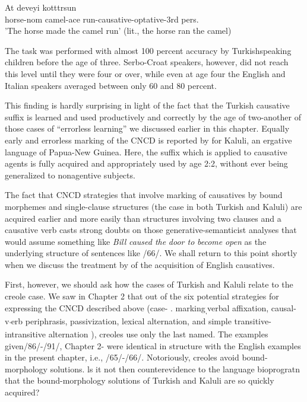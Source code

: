 \ea\label{ex:76}
 At deveyi kotttrsun\\
horse-nom camel-ace run-causative-optative-3rd pers. \\
\glt'The horse made the camel run' (lit., the horse ran the camel)
\z
 

The task was performed with almost 100 percent accuracy by Turkish\-speaking children before the age of three. Serbo-Croat speakers, however, did not reach this level until they were four or over, while even at age four the English and Italian speakers averaged between only 60 and 80 percent.

This finding is hardly surprising in light of the fact that the Turkish causative suffix is learned and used productively and correctly by the age of two-another of those cases of ``errorless learning'' we discussed earlier in this chapter. Equally early and errorless marking of the CNCD is reported by \citet{Schiefflin1979} for Kaluli, an ergative language of Papua-New Guinea. Here, the suffix which is applied to causative agents is fully acquired and appropriately used by age 2:2, withont ever being generalized to nonagentive subjects.

The fact that CNCD strategies that involve marking of causatives by bound morphemes and single-clause structures (the case in both Turkish and Kaluli) are acquired earlier and more easily than struc\-tures involving two clauses and a causative verb casts strong doubts on those generative-semanticist analyses that would assume something like \textit{Bill} \textit{caused the} \textit{door to} \textit{become} \textit{open} as the underlying structure of sentences like /66/. We shall return to this point shortly when we discuss the treatment by \citet{Bowerman1974} of the acquisition of English causatives.

First, however, we should ask how the cases of Turkish and
Kaluli relate to the creole case. We saw in Chapter 2 that out of the six potential strategies for expressing the CNCD described above (case- . marking\textsubscript{,}verbal affixation, causal-v\textsubscript{'}erb periphrasis, passivization, lexical
alternation, and simple transitive-intransitive alternation ), creoles use only the last named. The examples given/86/-/91/, Chapter 2- were identical in structure with the English examples in the present chapter, i.e., /65/-/66/. Notoriously, creoles avoid bound-morphology solutions. ls it not then counterevidence to the language bioprogratn that the bound-morphology solutions of Turkish and Kaluli are so quickly acquired?

